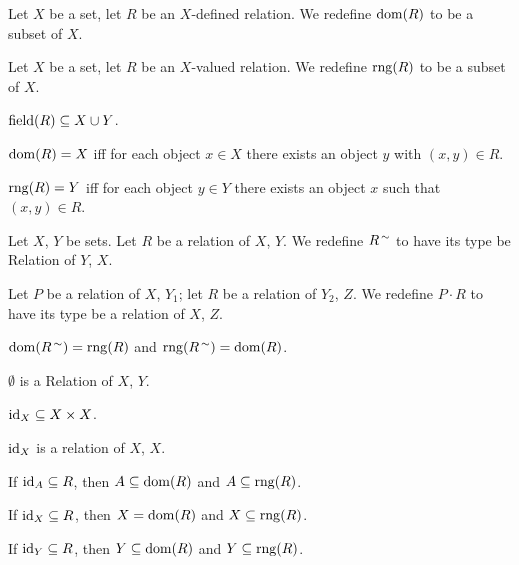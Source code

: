 \documentclass{article}
\begin{document}
\begin{definition}
Let $X$ be a set, let $R$ be an $X$-defined relation. We redefine
$\operatorname{dom}(R)$ to be a subset of $X$.
\end{definition}

\begin{definition}
Let $X$ be a set, let $R$ be an $X$-valued relation. We redefine
$\operatorname{rng}(R)$ to be a subset of $X$.
\end{definition}

\begin{thm}
\item\label{relset1:8} $\operatorname{field}(R)\subseteq X\cup Y$.
\item\label{relset1:9} $\operatorname{dom}(R)=X$ iff for each object $x\in X$ there exists an object
  $y$ with $(x,y)\in R$.
\item\label{relset1:10} $\operatorname{rng}(R)=Y$ iff for each object $y\in Y$ there
  exists an object $x$ such that $(x,y)\in R$.
\end{thm}

\begin{definition}
Let $X$, $Y$ be sets. Let $R$ be a relation of $X$, $Y$. We redefine
$R^{\,\sim}$ to have its type be Relation of $Y$, $X$.
\end{definition}

\begin{definition}
Let $P$ be a relation of $X$, $Y_{1}$; let $R$ be a relation of $Y_{2}$, $Z$.
We redefine $P\cdot R$ to have its type be a relation of $X$, $Z$.
\end{definition}

\begin{thm}
\item\label{relset1:11} $\operatorname{dom}(R^{\,\sim})=\operatorname{rng}(R)$ and $\operatorname{rng}(R^{\,\sim})=\operatorname{dom}(R)$.
\item\label{relset1:12} $\emptyset$ is a Relation of $X$, $Y$.
\item\label{relset1:13} $\operatorname{id}_{X}\subseteq X\times X$.
\item\label{relset1:14} $\operatorname{id}_{X}$ is a relation of $X$, $X$.
\item\label{relset1:15} If $\operatorname{id}_{A}\subseteq R$, then $A\subseteq\operatorname{dom}(R)$
  and $A\subseteq\operatorname{rng}(R)$.
\item\label{relset1:16} If $\operatorname{id}_{X}\subseteq R$, then $X=\operatorname{dom}(R)$ and $X\subseteq\operatorname{rng}(R)$.
\item\label{relset1:17} If $\operatorname{id}_{Y}\subseteq R$, then $Y\subseteq\operatorname{dom}(R)$
  and $Y\subseteq\operatorname{rng}(R)$.
\end{thm}
\end{document}
